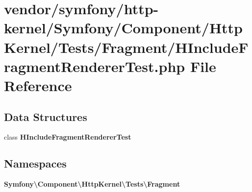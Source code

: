 \section{vendor/symfony/http-\/kernel/\+Symfony/\+Component/\+Http\+Kernel/\+Tests/\+Fragment/\+H\+Include\+Fragment\+Renderer\+Test.php File Reference}
\label{_h_include_fragment_renderer_test_8php}
\subsection*{Data Structures}
\begin{DoxyCompactItemize}
\item 
class {\bf H\+Include\+Fragment\+Renderer\+Test}
\end{DoxyCompactItemize}
\subsection*{Namespaces}
\begin{DoxyCompactItemize}
\item 
 {\bf Symfony\textbackslash{}\+Component\textbackslash{}\+Http\+Kernel\textbackslash{}\+Tests\textbackslash{}\+Fragment}
\end{DoxyCompactItemize}
